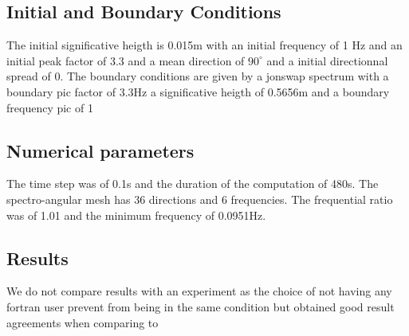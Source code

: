 %
%
\subsection{Initial and Boundary Conditions}
%
    The initial  significative heigth is 0.015m with an initial frequency of 1 Hz and an initial peak factor of 3.3 and a mean direction of $90^{\circ}$ and a initial directionnal spread of 0.
The boundary conditions are given by a jonswap spectrum with a boundary pic factor of 3.3Hz a significative heigth of 0.5656m and a boundary frequency pic of 1

%
%
\subsection{Numerical parameters}
%
The time step was of 0.1s and the duration of the computation of 480s. The spectro-angular mesh has 36 directions and 6 frequencies. The frequential ratio was of 1.01 and the minimum frequency of 0.0951Hz.

\subsection{Results}
We do not compare results with an experiment as the choice of not having any fortran user prevent from being in the same condition but \cite{Bacchi2014} obtained good result agreements when comparing to \cite{Mendez2004}